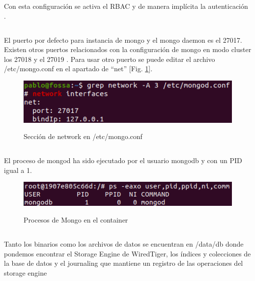 \documentclass[10pt,a4paper]{article}
\begin{document}
Con esta configuración se activa el RBAC y de manera implícita la autenticación \cite{mongosec}.

\subsection{}
El puerto por defecto para instancia de mongo y el mongo daemon es el 27017. Existen otros puertos relacionados con la configuración de mongo en modo cluster los 27018 y el 27019 \cite{mongoports}.
Para usar otro puerto se puede editar el archivo /etc/mongo.conf en el apartado de ``net'' [Fig. \ref{fig:mongo_net}].
\begin{figure}[h!]
  \centering
  \includegraphics[scale=0.4]{mongonet.png}\\
  \caption{Sección de network en /etc/mongo.conf}
  \label{fig:mongo_net}
\end{figure}

\pagebreak

\subsection{}
El proceso de mongod ha sido ejecutado por el usuario mongodb y con un PID igual a 1.
\begin{figure}[h!]
  \centering
  \includegraphics[scale=0.4]{mongod_perm.png}\\
  \caption{Procesos de Mongo en el container}
  \label{fig:mongo_proc}
\end{figure}

\subsection{}
Tanto los binarios como los archivos de datos se encuentran en /data/db donde pondemos encontrar el Storage Engine de WiredTiger, los índices y colecciones de la base de datos y el journaling que mantiene un registro de las operaciones del storage engine \cite{journaling}
\end{document}

